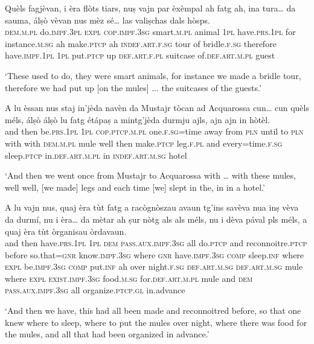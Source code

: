 \begin{linenumbers}
\gll  Quèls fagjèvan, i èra flòts tiars, nuṣ vajn par èxèmpal ah fatg ah, ina tura… da sauma, álṣò vèvan nus mèz sé… las valiṣchas dals hòsps.  \\
 \textsc{dem.m.pl} do.\textsc{impf.3pl} \textsc{expl} \textsc{cop.impf.3sg} smart.\textsc{m.pl} animal \textsc{1pl} have.\textsc{prs.1pl} for instance.\textsc{m.sg} ah  make.\textsc{ptcp} ah  \textsc{indef.art.f.sg} tour of bridle.\textsc{f.sg} therefore have.\textsc{impf.1pl}  \textsc{1pl} put.\textsc{ptcp} up \textsc{def.art.f.pl} suitcase  of.\textsc{def.art.m.pl} guest \\
\end{linenumbers}
\medskip
\glt `These used to do, they were smart animals, for instance we made a bridle tour, therefore we had put up [on the mules] ... the suitcases of the guests.'
\medskip

\begin{linenumbers}
\gll  A lu èssan nus staj in’jèda navèn da Mustajr tòcan ad Acquarossa cun… cun quèls méls, álṣò álṣò lu fatg étápaṣ a mintg’jèda durmju ajls, ajn ajn in hòtèl.  \\
and then be.\textsc{prs.1pl} \textsc{1pl} \textsc{cop.ptcp.m.pl} one.\textsc{f.sg=}time away from  \textsc{pln} until to \textsc{pln} with with \textsc{dem.m.pl} mule well then  make.\textsc{ptcp}  leg.\textsc{f.pl} and every=time.\textsc{f.sg} sleep.\textsc{ptcp} in.\textsc{def.art.m.pl} in \textsc{indef.art.m.sg} hotel  \\
\end{linenumbers}
\medskip
\glt `And then we went once from Mustajr to Acquarossa with … with these mules, well well, [we made] legs and each time [we] slept in the, in in a hotel.'
\medskip

\begin{linenumbers}
\gll   A lu vajn nus, quaj èra tùt fatg a racògnòszau avaun tg’ins savèva nua inṣ vèva da durmí, nu i èra… da mètar ah ṣur nòtg als als méls, nu i dèva pával pls méls, a quaj èra tùt òrganisau òrdavaun. \\
and then have.\textsc{prs.1pl} \textsc{1pl} \textsc{dem} \textsc{pass.aux.impf.3sg} all do.\textsc{ptcp} and  reconnoitre.\textsc{ptcp} before so.that=\textsc{gnr}  know.\textsc{impf.3sg} where \textsc{gnr} have.\textsc{impf.3sg} \textsc{comp}  sleep.\textsc{inf} where \textsc{expl} be.\textsc{impf.3sg} \textsc{comp}  put.\textsc{inf} ah over night.\textsc{f.sg} \textsc{def.art.m.sg} \textsc{def.art.m.sg} mule where \textsc{expl} \textsc{exist.impf.3sg}  food.\textsc{m.sg} for.\textsc{def.art.m.pl} mule and \textsc{dem} \textsc{pass.aux.impf.3sg} all organize.\textsc{ptcp.gl} in.advance \\
\end{linenumbers}
\medskip
\glt `And then we have, this had all been made and reconnoitred before, so that one knew where to sleep, where to put the mules over night, where there was food for the mules, and all that had been organized in advance.'
\medskip

